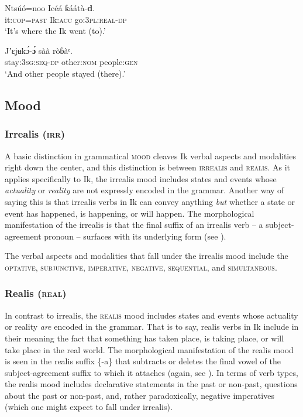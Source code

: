 \ea\label{ex:verbs:7}
\gll Ntsúó=noo     Icéá     ƙáátà-\textbf{d\ᵉ}. \\
it:\textsc{cop}=\textsc{past}    Ik:\textsc{acc}   go:\textsc{3pl:real-dp}    \\
\glt ‘It’s where the Ik went (to).’ 
\z




\ea\label{ex:verbs:8}
\gll Jʼɛʝʉk\'{ɔ}-\textbf{\'{ɔ}}     sàà     ròɓàᵉ. \\
stay:\textsc{3sg:seq-dp}   other:\textsc{nom}   people:\textsc{gen}    \\
\glt ‘And other people stayed (there).’ 
\z






\subsection{Mood}\label{sec:8.9}
\subsubsection{Irrealis (\textsc{irr})}\label{sec:8.9.1}

A basic distinction in grammatical \textsc{mood} cleaves Ik verbal aspects and modalities right down the center, and this distinction is between \textsc{irrealis} and \textsc{realis}. As it applies specifically to Ik, the irrealis mood includes states and events whose \textit{actuality} or \textit{reality} are not expressly encoded in the grammar. Another way of saying this is that irrealis verbs in Ik can convey anything \textit{but} whether a state or event has happened, is happening, or will happen. The morphological manifestation of the irrealis is that the final suffix of an irrealis verb – a subject-agreement pronoun – surfaces with its underlying form (see ). 

The verbal aspects and modalities that fall under the irrealis mood include the \textsc{optative}, \textsc{subjunctive}, \textsc{imperative}, \textsc{negative}, \textsc{sequential}, and \textsc{simultaneous}. 


\subsubsection{Realis (\textsc{real})}\label{sec:8.9.2}

In contrast to irrealis, the \textsc{realis} mood includes states and events whose actuality or reality \textit{are} encoded in the grammar. That is to say, realis verbs in Ik include in their meaning the fact that something has taken place, is taking place, or will take place in the real world. The morphological manifestation of the realis mood is seen in the realis suffix \{-a\} that subtracts or deletes the final vowel of the subject-agreement suffix to which it attaches (again, see ). In terms of verb types, the realis mood includes declarative statements in the past or non-past, questions about the past or non-past, and, rather paradoxically, negative imperatives (which one might expect to fall under irrealis).



